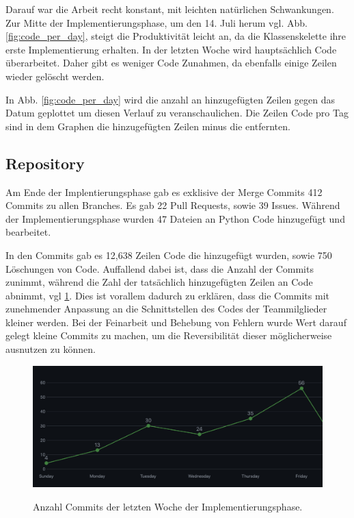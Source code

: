 \documentclass{article}
\begin{document}
Darauf war die Arbeit recht konstant, mit leichten natürlichen Schwankungen. Zur Mitte der Implementierungsphase, um den 14. Juli herum vgl. Abb. \ref{fig:code_per_day}, steigt die Produktivität leicht an, da die Klassenskelette ihre erste Implementierung erhalten. In der letzten Woche wird hauptsächlich Code überarbeitet. Daher gibt es weniger Code Zunahmen, da ebenfalls einige Zeilen wieder gelöscht werden. 

In Abb. \ref{fig:code_per_day} wird die anzahl an hinzugefügten Zeilen gegen das Datum geplottet um diesen Verlauf zu veranschaulichen. Die Zeilen Code pro Tag sind in dem Graphen die hinzugefügten Zeilen minus die entfernten.

\subsection{Repository}

Am Ende der Implentierungsphase gab es exklisive der Merge Commits 412 Commits zu allen Branches. Es gab 22 Pull Requests, sowie 39 Issues. Während der Implementierungsphase wurden 47 Dateien an Python Code hinzugefügt und bearbeitet.

In den Commits gab es 12,638 Zeilen Code die hinzugefügt wurden, sowie 750 Löschungen von Code. Auffallend dabei ist, dass die Anzahl der Commits zunimmt, während die Zahl der tatsächlich hinzugefügten Zeilen an Code abnimmt, vgl \ref{fig:commits_last_week}. Dies ist vorallem dadurch zu erklären, dass die Commits mit zunehmender Anpassung an die Schnittstellen des Codes der Teammilglieder kleiner werden. Bei der Feinarbeit und Behebung von Fehlern wurde Wert darauf gelegt kleine Commits zu machen, um die Reversibilität dieser möglicherweise ausnutzen zu können.

\begin{figure}[H]%
    \centering
    \includegraphics[width=12cm]{docs/implementation/report/img/CommitsDerLetztenWoche.png}
    \label{fig:commits_last_week}
    \caption{Anzahl Commits der letzten Woche der Implementierungsphase.}
\end{figure}
\end{document}
